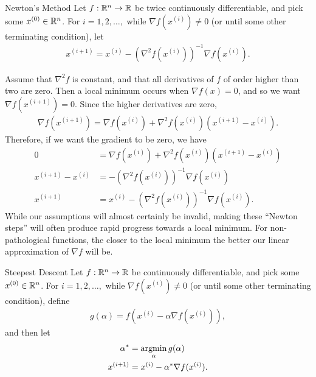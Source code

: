 \begin{defn}{Newton's Method}\label{newtons-method}\proofbreak
    Let $f: \mathbb{R}^n \to \mathbb{R}$ be twice continuously differentiable, and pick some $x^{(0)} \in \mathbb{R}^n$. For $i = 1, 2, \ldots, $ while $\nabla f(x^{(i)}) \neq 0$ (or until some other terminating condition), let
    \begin{align*}
        x^{(i+1)} = x^{(i)} - \left(\nabla^2f(x^{(i)})\right)^{-1}\nabla f(x^{(i)}).
    \end{align*}
\end{defn}

\begin{rmk}
    Assume that $\nabla^2f$ is constant, and that all derivatives of $f$ of order higher than two are zero. Then a local minimum occurs when $\nabla f(x) = 0$, and so we want $\nabla f(x^{(i+1)}) = 0$. Since the higher derivatives are zero,
    \begin{align*}
        \nabla f(x^{(i+1)}) = \nabla f(x^{(i)}) + \nabla^2f(x^{(i)})(x^{(i+1)} - x^{(i)}).
    \end{align*}
    Therefore, if we want the gradient to be zero, we have
    \begin{align*}
        0 &= \nabla f(x^{(i)}) + \nabla^2f(x^{(i)})(x^{(i+1)} - x^{(i)}) \\
        x^{(i+1)} - x^{(i)} &= -\left(\nabla^2f(x^{(i)})\right)^{-1}\nabla f(x^{(i)}) \\
        x^{(i+1)} &= x^{(i)} - \left(\nabla^2f(x^{(i)})\right)^{-1}\nabla f(x^{(i)}).
    \end{align*}
    While our assumptions will almost certainly be invalid, making these ``Newton steps'' will often produce rapid progress towards a local minimum. For non-pathological functions, the closer to the local minimum the better our linear approximation of $\nabla f$ will be.
\end{rmk}

\begin{defn}{Steepest Descent}\label{steepest-method}\proofbreak
    Let $f: \mathbb{R}^n \to \mathbb{R}$ be continuously differentiable, and pick some $x^{(0)} \in \mathbb{R}^n$. 
    For $i = 1, 2, \ldots, $ while $\nabla f(x^{(i)}) \neq 0$ (or until some other terminating condition), define
    \begin{align*}
        g(\alpha) = f(x^{(i)} - \alpha\nabla f(x^{(i)})),
    \end{align*}
    and then let
    \begin{align*}
        \alpha^* &= \operatorname*{argmin}_{\alpha}g(\alpha) \\
        x^{(i+1)} &= x^{(i)} - \alpha^{*}\nabla f(x^{(i)}).
    \end{align*}
\end{defn}

